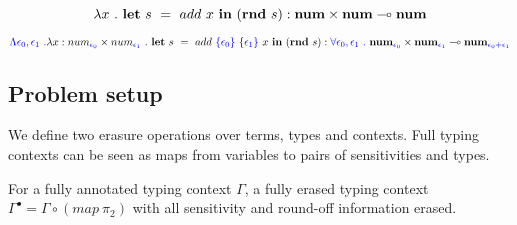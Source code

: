 \begin{example}
  \begin{equation}
    \lambda x \ . \ \mathbf{let} \ s \ = \ add \ x \ \tin \ (\mathbf{rnd} \ s)
    : \textbf{num} \times \textbf{num} \multimap \textbf{num}
  \end{equation}
\end{example}
\begin{example}
  \begin{equation}
    \bnd{\Lambda \epsilon_0, \epsilon_1 \ .} \lambda x : num_{\bnd{\epsilon_0}}
    \times num_{\bnd{\epsilon_1}} \ . \ 
    \mathbf{let} \ s \ = \ add \ \bnd{\{\epsilon_0\}} \ \{\bnd{\epsilon_1\}} \ x
    \ \tin \ (\mathbf{rnd} \ s)
    : 
    \bnd{\forall \epsilon_0, \epsilon_1 \ .} \ 
    \textbf{num}_{\bnd{\epsilon_0}} \times \textbf{num}_{\bnd{\epsilon_1}}
    \multimap
    \textbf{num}_{\bnd{\epsilon_0 + \epsilon_1}}
  \end{equation}
\end{example}

\subsection{Problem setup}
We define two erasure operations over terms, types and contexts. Full typing contexts
can be seen as maps from variables to pairs of sensitivities and types. 

\begin{definition}
For a fully annotated typing context $\Gamma$, a fully erased typing context
$\Gamma^{\bullet} = \Gamma \circ (map \ \pi_2)$ with all sensitivity and
round-off information erased.
\end{definition}

